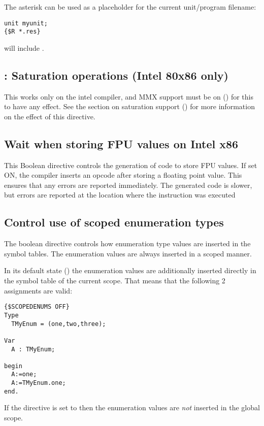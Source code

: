 The asterisk can be used as a placeholder for the current unit/program filename:
\begin{verbatim}
unit myunit;
{$R *.res}
\end{verbatim}
will include .

\subsection{ : Saturation operations (Intel 80x86 only)}

This works only on the intel compiler, and MMX support must be on
() for this to have any effect. See the section on
saturation support () for more information
on the effect of this directive.

\subsection{ Wait when storing FPU values on Intel x86}

This Boolean directive controls the generation of code to store FPU values.  
If set ON, the compiler inserts an  opcode after storing
a floating point value.  This ensures that any errors are reported
immediately.  The generated code is slower, but errors are reported at
the location where the instruction was executed


\subsection{ Control use of scoped enumeration types}
The boolean  directive controls how enumeration type values 
are inserted in the symbol tables. The enumeration values are always
inserted in a scoped manner. 

In its default state () the enumeration values are additionally inserted 
directly in the symbol table of the current scope. That means that the
following 2 assignments are valid: 

\begin{verbatim}
{$SCOPEDENUMS OFF}
Type
  TMyEnum = (one,two,three);

Var
  A : TMyEnum;

begin
  A:=one;
  A:=TMyEnum.one;
end.
\end{verbatim}

If the directive is set to  then the enumeration values are {\em
not} inserted in the global scope.

